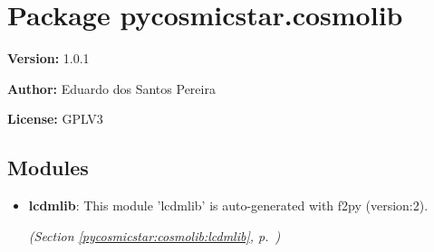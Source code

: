 %
%
%


\section{Package pycosmicstar.cosmolib}

    \label{pycosmicstar:cosmolib}
\textbf{Version:} 1.0.1



\textbf{Author:} Eduardo dos Santos Pereira



\textbf{License:} GPLV3





\subsection{Modules}

\begin{itemize}
\setlength{\parskip}{0ex}
\item \textbf{lcdmlib}: This module 'lcdmlib' is auto-generated with f2py (version:2).



  \textit{(Section \ref{pycosmicstar:cosmolib:lcdmlib}, p.~\pageref{pycosmicstar:cosmolib:lcdmlib})}

\end{itemize}

